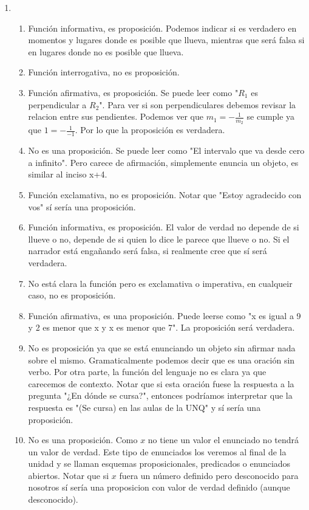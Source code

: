 \documentclass[a4paper]{article}
\newcommand{\exercise}{\item}
\begin{document}
\begin{enumerate}
\begin{enumerate} [label=(\alph*)]
\end{enumerate}\exercise\begin{enumerate} [label=(\alph*)]		\item Función informativa, es proposición. Podemos indicar si es verdadero en momentos y lugares donde es posible que llueva, mientras que será falsa si en lugares donde no es posible que llueva.
		\item Función interrogativa, no es proposición.
		\item Función afirmativa, es proposición. Se puede leer como "$R_1$ es perpendicular a $R_2$". Para ver si son perpendiculares debemos revisar la relacion entre sus pendientes. Podemos ver que $m_1 = -\frac{1}{m_2}$ se cumple ya que $1 = -\frac{1}{-1}$. Por lo que la proposición es verdadera.
		\item No es una proposición. Se puede leer como "El intervalo que va desde cero a infinito". Pero carece de afirmación, simplemente enuncia un objeto, es similar al inciso x+4.
		\item Función exclamativa, no es proposición. Notar que "Estoy agradecido con vos" sí sería una proposición.
		\item Función informativa, es proposición. El valor de verdad no depende de si llueve o no, depende de si quien lo dice le parece que llueve o no. Si el narrador está engañando será falsa, si realmente cree que sí será verdadera.
		\item No está clara la función pero es exclamativa o imperativa, en cualqueir caso, no es proposición.
		\item Función afirmativa, es una proposición. Puede leerse como "x es igual a 9 y 2 es menor que x y x es menor que 7". La proposición será verdadera.
		\item No es proposición ya que se está enunciando un objeto sin afirmar nada sobre el mismo. Gramaticalmente podemos decir que es una oración sin verbo. Por otra parte, la función del lenguaje no es clara ya que carecemos de contexto. Notar que si esta oración fuese la respuesta a la pregunta "¿En dónde se cursa?", entonces podríamos interpretar que la respuesta es "(Se cursa) en las aulas de la UNQ" y sí sería una proposición.
		\item No es una proposición. Como $x$ no tiene un valor el enunciado no tendrá un valor de verdad. Este tipo de enunciados los veremos al final de la unidad y se llaman esquemas proposicionales, predicados o enunciados abiertos. Notar que si $x$ fuera un número definido pero desconocido para nosotros sí sería una proposicion con valor de verdad definido (aunque desconocido).

\end{enumerate}
\end{enumerate}
\end{document}
